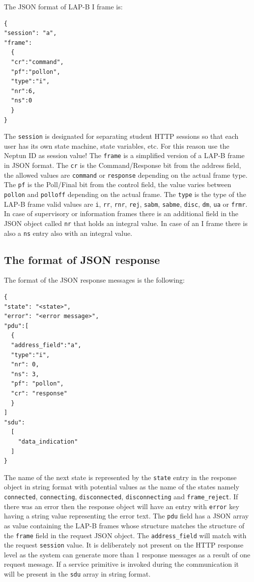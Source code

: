 \documentclass[a4paper]{article}
\begin{document}
The JSON format of LAP-B I frame is:
\begin{verbatim}
{
"session": "a", 
"frame": 
  {
  "cr":"command",
  "pf":"pollon",
  "type":"i",
  "nr":6,
  "ns":0
  }
}
\end{verbatim}

The \verb!session! is designated for separating student HTTP sessions so that each user has its own state machine, state variables, etc. For this reason use the Neptun ID as session value!  The \verb!frame! is a simplified version of a LAP-B
frame in JSON format. The \verb!cr! is the Command/Response bit from the address field, the allowed values are \verb!command! or \verb!response! depending on the actual frame type. The \verb!pf! is the Poll/Final bit from the control field, the value varies between \verb!pollon! and \verb!polloff! depending on the actual frame. The \verb!type! is the type of the LAP-B frame valid values are \verb!i!, \verb!rr!, \verb!rnr!, \verb!rej!,
\verb!sabm!, \verb!sabme!, \verb!disc!, \verb!dm!, \verb!ua! or
\verb!frmr!. In case of supervisory or information frames there is an additional field in the JSON object called \verb!nr! that holds an integral value.
In case of an I frame there is also a \verb!ns! entry also with an integral value.

\subsection{The format of JSON response}

The format of the JSON response messages is the following:
\begin{verbatim}
{
"state": "<state>",
"error": "<error message>",
"pdu":[
  {
  "address_field":"a",
  "type":"i",
  "nr": 0,
  "ns": 3,
  "pf": "pollon",
  "cr": "response"
  }
]
"sdu":
  [
    "data_indication"
  ]
}
\end{verbatim}

The name of the next state is represented by the \verb!state! entry in the response object in string format with potential values as the name of the states namely 
\verb!connected!,
\verb!connecting!, \verb!disconnected!,
\verb!disconnecting! and \verb!frame_reject!.
If there was an error then the response object will have an entry with \verb!error! key having a string value representing the error text.
The \verb!pdu! field has a JSON array as value containing the LAP-B frames whose structure matches the structure of the \verb!frame! field in the request JSON object.
The \verb!address_field! will match with the request \verb!session! value. It is deliberately not present on the HTTP response level as the system can generate more than 1 response messages as a result of one request message. If a service primitive is invoked during the communication it will be present in the \verb!sdu! array in string format.
\end{document}
